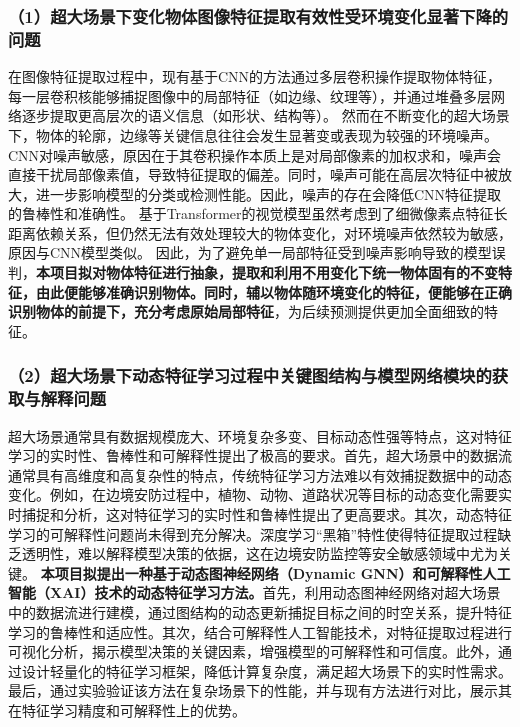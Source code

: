 \subsubsection*{\bfseries （1）超大场景下变化物体图像特征提取有效性受环境变化显著下降的问题}
在图像特征提取过程中，现有基于CNN的方法通过多层卷积操作提取物体特征，每一层卷积核能够捕捉图像中的局部特征（如边缘、纹理等），并通过堆叠多层网络逐步提取更高层次的语义信息（如形状、结构等）。
然而在不断变化的超大场景下，物体的轮廓，边缘等关键信息往往会发生显著变或表现为较强的环境噪声。
CNN对噪声敏感，原因在于其卷积操作本质上是对局部像素的加权求和，噪声会直接干扰局部像素值，导致特征提取的偏差。同时，噪声可能在高层次特征中被放大，进一步影响模型的分类或检测性能。因此，噪声的存在会降低CNN特征提取的鲁棒性和准确性。
基于Transformer的视觉模型虽然考虑到了细微像素点特征长距离依赖关系，但仍然无法有效处理较大的物体变化，对环境噪声依然较为敏感，原因与CNN模型类似。
因此，为了避免单一局部特征受到噪声影响导致的模型误判，\textbf{本项目拟对物体特征进行抽象，提取和利用不用变化下统一物体固有的不变特征，由此便能够准确识别物体。同时，辅以物体随环境变化的特征，便能够在正确识别物体的前提下，充分考虑原始局部特征}，为后续预测提供更加全面细致的特征。


\subsubsection*{\bfseries （2）超大场景下动态特征学习过程中关键图结构与模型网络模块的获取与解释问题}
超大场景通常具有数据规模庞大、环境复杂多变、目标动态性强等特点，这对特征学习的实时性、鲁棒性和可解释性提出了极高的要求。首先，超大场景中的数据流通常具有高维度和高复杂性的特点，传统特征学习方法难以有效捕捉数据中的动态变化。例如，在边境安防过程中，植物、动物、道路状况等目标的动态变化需要实时捕捉和分析，这对特征学习的实时性和鲁棒性提出了更高要求。其次，动态特征学习的可解释性问题尚未得到充分解决。深度学习“黑箱”特性使得特征提取过程缺乏透明性，难以解释模型决策的依据，这在边境安防监控等安全敏感领域中尤为关键。
\textbf{本项目拟提出一种基于动态图神经网络（Dynamic GNN）和可解释性人工智能（XAI）技术的动态特征学习方法。}首先，利用动态图神经网络对超大场景中的数据流进行建模，通过图结构的动态更新捕捉目标之间的时空关系，提升特征学习的鲁棒性和适应性。其次，结合可解释性人工智能技术，对特征提取过程进行可视化分析，揭示模型决策的关键因素，增强模型的可解释性和可信度。此外，通过设计轻量化的特征学习框架，降低计算复杂度，满足超大场景下的实时性需求。最后，通过实验验证该方法在复杂场景下的性能，并与现有方法进行对比，展示其在特征学习精度和可解释性上的优势。

